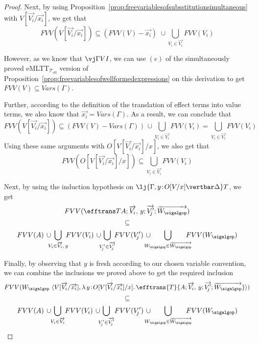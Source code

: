 \begin{proof}
Next, by using Proposition~\ref{prop:freevariablesofsubsstitutionsimultaneous} with  $V[\overrightarrow{V_i}/\overrightarrow{x_i}]$, we get that
\[
FVV(V[\overrightarrow{V_i}/\overrightarrow{x_i}]) \subseteq (FVV(V) - \overrightarrow{x_i}) \,\,\cup \bigcup_{V_i \in \overrightarrow{V_i}} \! FVV(V_i)
\]

However, as we know that $\vj \Gamma V I$, we can use $(e)$ of the simultaneously proved eMLTT$_{\mathcal{T}_{\text{eff}}}$ version of Proposition~\ref{prop:freevariablesofwellformedexpressions} on this derivation to get $FVV(V) \subseteq V\!ars(\Gamma)$. 

Further, according to the definition of the translation of effect terms into value terms, we also know that $\overrightarrow{x_i} = V\!ars(\Gamma)$. As a result, we can conclude that
\[
FVV(V[\overrightarrow{V_i}/\overrightarrow{x_i}]) \subseteq (FVV(V) - V\!ars(\Gamma)) \,\cup\!\! \bigcup_{V_i \in \overrightarrow{V_i}} \!  FVV(V_i) = \bigcup_{V_i \in \overrightarrow{V_i}} \!  FVV(V_i)
\] 
Using these same arguments with $O[V[\overrightarrow{V_i}/\overrightarrow{x_i}]/x]$, we also get that
\[
FVV(O[V[\overrightarrow{V_i}/\overrightarrow{x_i}]/x]) \subseteq \bigcup_{V_i \in \overrightarrow{V_i}} \!  FVV(V_i)
\]
%

\pagebreak

Next, by using the induction hypothesis on $\lj {\Gamma, y \!:\! O[V/x] \vertbar \Delta} T$, we get
\[
FVV(\efftrans T {A; \overrightarrow{V_i},\, y; \overrightarrow{V'_{\!j}}; \overrightarrow{W_{\sigalgop}}}) 
\]
\[
\subseteq 
\]
\[
FVV(A) \,\cup\!\!\!\! \bigcup_{V_i \in \overrightarrow{V_i},\, y} \!\!\! FVV(V_i) \,\cup\!\!\!  \bigcup_{V'_{\!j} \in \overrightarrow{V'_{\!j}}} \!\! FVV(V'_{\!j}) \,\cup\!\!\!\!\!\!\! \bigcup_{W_{\sigalgop} \in \overrightarrow{W_{\sigalgop}}} \!\!\!\!\!\! FVV(W_{\sigalgop}) 
\]
%

Finally, by observing that $y$ is fresh according to our chosen variable convention, we can combine the  inclusions we proved above to get the required inclusion
\[
FVV(W_{\sigalgop}\,\, \langle V[\overrightarrow{V_i}/\overrightarrow{x_i}] , \lambda\, y \!:\! O[V[\overrightarrow{V_i}/\overrightarrow{x_i}]/x] .\, \efftrans {T} {A; \overrightarrow{V_i},\, y; \overrightarrow{V'_{\!j}}; \overrightarrow{W_{\sigalgop}}}\rangle)
\vspace{-0.25cm}
\]
\[
\subseteq
\]
\[
FVV(A) \,\cup\!\! \bigcup_{V_i \in \overrightarrow{V_i}} \! FVV(V_i) \,\cup\!\!\! \bigcup_{V'_{\!j} \in \overrightarrow{V'_{\!j}}} \! FVV(V'_{\!j}) \,\cup\!\!\!\!\!\!\! \bigcup_{W_{\sigalgop} \in \overrightarrow{W_{\sigalgop}}} \!\!\!\!\!\! FVV(W_{\sigalgop}) 
\vspace{-0.25cm}
\]
\end{proof}


